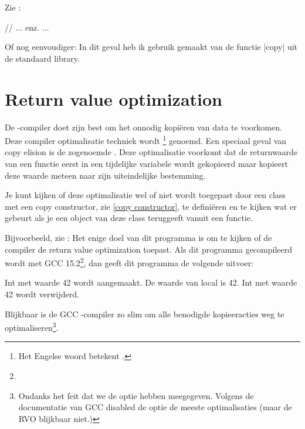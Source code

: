 \begin{cpplstShortInline}
Zie :
\vspace{-.8\baselineskip}
\begin{cpplstfragment}
// ... enz. ...
\end{cpplstfragment}
\vspace{-.8\baselineskip}

Of nog eenvoudiger:
In dit geval heb ik gebruik gemaakt van de functie |copy| uit de standaard library.

\section{Return value optimization}
\label{sec:rvo}
De \Cpp{}\hyp{}compiler doet zijn best om het onnodig kopiëren van data te voorkomen.
Deze compiler optimalisatie techniek wordt \footnote{%
	Het Engelse woord  betekent .
} genoemd.
Een speciaal geval van copy elision is de zogenoemde \label{RVO}.
Deze optimalisatie voorkomt dat de returnwaarde van een functie eerst in een tijdelijke variabele wordt gekopieerd maar kopieert deze waarde meteen naar zijn uiteindelijke bestemming.

Je kunt kijken of deze optimalisatie wel of niet wordt toegepast door een class met een copy constructor, zie \cref{copy constructor}, te definiëren en te kijken wat er gebeurt als je een object van deze class teruggeeft vanuit een functie.

Bijvoorbeeld, zie :
Het enige doel van dit programma is om te kijken of de compiler de return value optimization toepast.
Als dit programma gecompileerd wordt met GCC 15.2\footnote{%
}, dan geeft dit programma de volgende uitvoer:
\begin{coutput}
Int met waarde 42 wordt aangemaakt.
De waarde van local is 42.
Int met waarde 42 wordt verwijderd.
\end{coutput}  
Blijkbaar is de GCC \Cpp{}\hyp{}compiler zo slim om alle benodigde kopieeracties weg te optimaliseren\footnote{%
	Ondanks het feit dat we de optie  hebben meegegeven. Volgens de documentatie van GCC\footnotemark{} disabled de optie  de meeste optimalisaties (maar de RVO blijkbaar niet.) 
}.


\end{cpplstShortInline}
